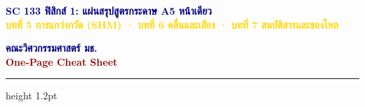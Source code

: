 \documentclass[10pt, a5paper]{article}
\begin{document}
\begin{minipage}{0.72\textwidth}
  {\fontsize{11.5}{13}\selectfont \textbf{\textcolor{navy}{SC 133 ฟิสิกส์ 1: แผ่นสรุปสูตรกระดาษ A5 หน้าเดียว}}} \\
  {\fontsize{7.5}{9}\selectfont \textbf{\textcolor{gold}{บทที่ 5 การแกว่งกวัด (SHM) · บทที่ 6 คลื่นและเสียง · บทที่ 7 สมบัติสารและของไหล}}}
\end{minipage}
\hfill
\begin{minipage}{0.26\textwidth}
  \raggedleft
  {\fontsize{7.5}{9}\selectfont \textbf{\textcolor{navy}{คณะวิศวกรรมศาสตร์ มธ.}}} \\
  {\fontsize{6.5}{8}\selectfont \textcolor{darkred}{\textbf{One-Page Cheat Sheet}}}
\end{minipage}
\vspace{1.5pt}\hrule height 1.2pt \vspace{3pt}
\end{document}
